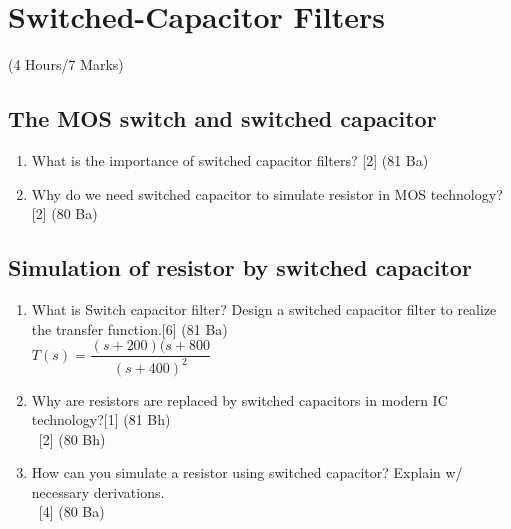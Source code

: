 \documentclass[12pt]{article}
\newcommand{\enter}{\\\textcolor{white}{1}}
\begin{document}
\pagebreak
\section{Switched-Capacitor Filters}
\begin{center}(4 Hours/7 Marks)\end{center}
\subsection{The MOS switch and switched capacitor}
\begin{enumerate}
	\item What is the importance of switched capacitor filters? \hfill [2] (81 Ba)

\item Why do we need switched capacitor to simulate resistor in MOS technology?\hfill[2] (80 Ba)
\end{enumerate}
\subsection{Simulation of resistor by switched capacitor}
\begin{enumerate}
\item What is Switch capacitor filter? Design a switched capacitor filter to realize the transfer function.\hfill [6] (81 Ba)\\
$T(s) = \dfrac{(s+200)(s+800}{(s+400)^2}$
\item Why are resistors are replaced by switched capacitors in modern IC technology?\hfill[1] (81 Bh)
\enter\hfill [2] (80 Bh)
\item How can you simulate a resistor using switched capacitor? Explain w/ necessary derivations.
\enter \hfill[4] (80 Ba)

\end{enumerate}
\end{document}
